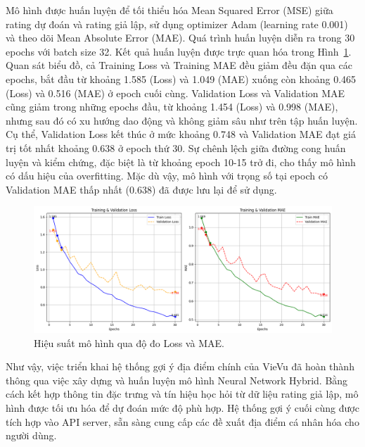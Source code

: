 Mô hình được huấn luyện để tối thiểu hóa Mean Squared Error (MSE) giữa rating dự đoán và rating giả lập, sử dụng optimizer Adam (learning rate 0.001) và theo dõi Mean Absolute Error (MAE). Quá trình huấn luyện diễn ra trong 30 epochs với batch size 32. Kết quả huấn luyện được trực quan hóa trong Hình~\ref{fig:mae}.
Quan sát biểu đồ, cả Training Loss và Training MAE đều giảm đều đặn qua các epochs, bắt đầu từ khoảng 1.585 (Loss) và 1.049 (MAE) xuống còn khoảng 0.465 (Loss) và 0.516 (MAE) ở epoch cuối cùng. Validation Loss và Validation MAE cũng giảm trong những epochs đầu, từ khoảng 1.454 (Loss) và 0.998 (MAE), nhưng sau đó có xu hướng dao động và không giảm sâu như trên tập huấn luyện. Cụ thể, Validation Loss kết thúc ở mức khoảng 0.748 và Validation MAE đạt giá trị tốt nhất khoảng 0.638 ở epoch thứ 30. Sự chênh lệch giữa đường cong huấn luyện và kiểm chứng, đặc biệt là từ khoảng epoch 10-15 trở đi, cho thấy mô hình có dấu hiệu của overfitting. Mặc dù vậy, mô hình với trọng số tại epoch có Validation MAE thấp nhất (0.638) đã được lưu lại để sử dụng.
    \begin{figure}[H]
        \centering
        \includegraphics[width=\textwidth]{figures/c4/128.png} %
        \caption{Hiệu suất mô hình qua độ đo Loss và MAE.} %
        \label{fig:mae} %
    \end{figure}

Như vậy, việc triển khai hệ thống gợi ý địa điểm chính của VieVu đã hoàn thành thông qua việc xây dựng và huấn luyện mô hình Neural Network Hybrid. Bằng cách kết hợp thông tin đặc trưng và tín hiệu học hỏi từ dữ liệu rating giả lập, mô hình được tối ưu hóa để dự đoán mức độ phù hợp. Hệ thống gợi ý cuối cùng được tích hợp vào API server, sẵn sàng cung cấp các đề xuất địa điểm cá nhân hóa cho người dùng.
